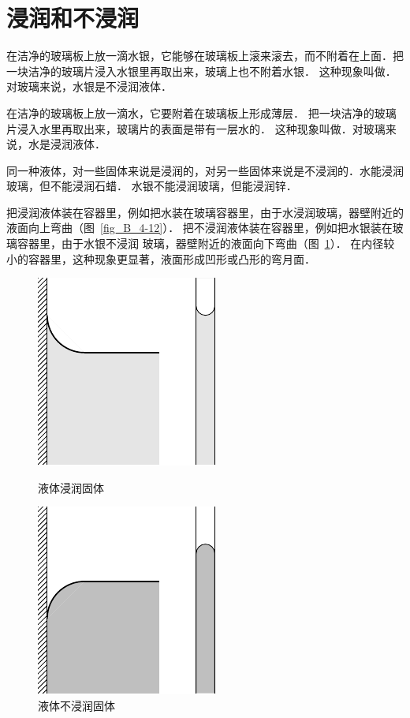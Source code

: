 \section{浸润和不浸润}
在洁净的玻璃板上放一滴水银，它能够在玻璃板上滚来滚去，而不附着在上面．把一块洁净的玻璃片浸入水银里再取出来，玻璃上也不附着水银．
这种现象叫做．对玻璃来说，水银是不浸润液体．

在洁净的玻璃板上放一滴水，它要附着在玻璃板上形成薄层．
把一块洁净的玻璃片浸入水里再取出来，玻璃片的表面是带有一层水的．
这种现象叫做．对玻璃来说，水是浸润液体．

同一种液体，对一些固体来说是浸润的，对另一些固体来说是不浸润的．水能浸润玻璃，但不能浸润石蜡．
水银不能浸润玻璃，但能浸润锌．

把浸润液体装在容器里，例如把水装在玻璃容器里，由于水浸润玻璃，器壁附近的液面向上弯曲（图~\ref{fig_B_4-12}）．
把不浸润液体装在容器里，例如把水银装在玻璃容器里，由于水银不浸润
玻璃，器壁附近的液面向下弯曲（图~\ref{fig_B_4-13}）．
在内径较小的容器里，这种现象更显著，液面形成凹形或凸形的弯月面．

\begin{figure}[htbp]
    \centering
    \begin{minipage}[t]{0.48\textwidth}
        \centering
        \includegraphics{fig/B/4-12.pdf}
        \caption{液体浸润固体}\label{fig_B_4-12}
    \end{minipage}
    \hfil
    \begin{minipage}[t]{0.48\textwidth}
        \centering
        \includegraphics{fig/B/4-13.pdf}
        \caption{液体不浸润固体}\label{fig_B_4-13}
    \end{minipage}
\end{figure}

